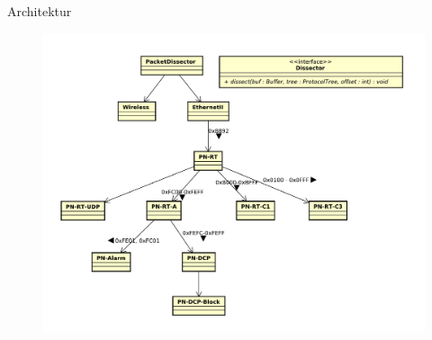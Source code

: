 \begin{frame}{Architektur}
    \begin{figure}
    	\centering
    	\includegraphics[width=\textwidth]{./images/dissector/7.pdf}
    \end{figure}
\end{frame}
